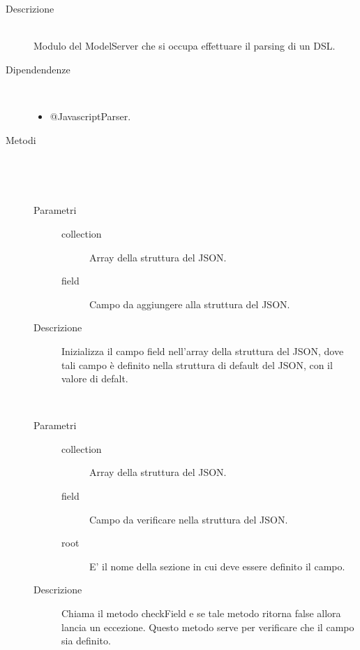 \begin{description}
 \item[Descrizione] \hfill \\
  Modulo del ModelServer che si occupa effettuare il parsing di un DSL.
 \item[Dipendendenze] \hfill \\
 \begin{itemize}
  \item{@JavascriptParser}.
 \end{itemize}
  
 \item[Metodi] \hfill \\
 \begin{mldescription}
  \hfill \\ 
 \begin{description}
     		\item[Parametri] \hfill
     			\begin{description}
     				\item[collection]
     				Array della struttura del JSON.
     				\item[field]
     				Campo da aggiungere alla struttura del JSON.
     			\end{description}
     		\item[Descrizione]
     		Inizializza il campo field nell'array della struttura del JSON, dove tali campo è definito nella struttura di default del JSON, con il valore di defalt.
 \end{description}
 \hfill \\
 \begin{description}
     		\item[Parametri] \hfill
     			\begin{description}
     				\item[collection]
     				Array della struttura del JSON.
     				\item[field]
     				Campo da verificare nella struttura del JSON.
     				\item[root]
     				E' il nome della sezione in cui deve essere definito il campo.
     			\end{description}
     		\item[Descrizione]
     		Chiama il metodo checkField e se tale metodo ritorna false allora lancia un eccezione. Questo metodo serve per verificare che il campo  sia definito. 
  \end{description}

\end{mldescription}
\end{description}
